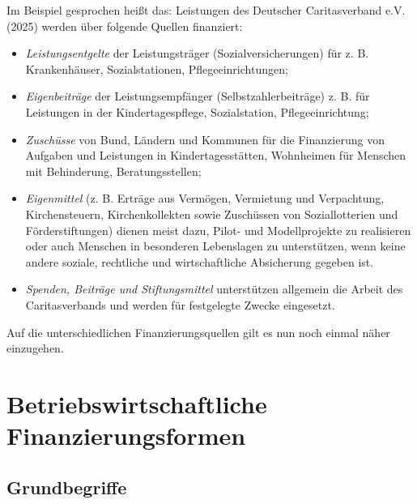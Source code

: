 \documentclass[
  letterpaper,
]{book}
\begin{document}
Im Beispiel gesprochen heißt das: Leistungen des Deutscher
Caritasverband e.V. (2025) werden über folgende Quellen finanziert:

\begin{itemize}
\item
  \emph{Leistungsentgelte} der Leistungsträger (Sozialversicherungen)
  für z. B. Krankenhäuser, Sozialstationen, Pflegeeinrichtungen;
\item
  \emph{Eigenbeiträge} der Leistungsempfänger (Selbstzahlerbeiträge) z.
  B. für Leistungen in der Kindertagespflege, Sozialstation,
  Pflegeeinrichtung;
\item
  \emph{Zuschüsse} von Bund, Ländern und Kommunen für die Finanzierung
  von Aufgaben und Leistungen in Kindertagesstätten, Wohnheimen für
  Menschen mit Behinderung, Beratungsstellen;
\item
  \emph{Eigenmittel} (z. B. Erträge aus Vermögen, Vermietung und
  Verpachtung, Kirchensteuern, Kirchenkollekten sowie Zuschüssen von
  Soziallotterien und Förderstiftungen) dienen meist dazu, Pilot- und
  Modellprojekte zu realisieren oder auch Menschen in besonderen
  Lebenslagen zu unterstützen, wenn keine andere soziale, rechtliche und
  wirtschaftliche Absicherung gegeben ist.
\item
  \emph{Spenden, Beiträge und Stiftungsmittel} unterstützen allgemein
  die Arbeit des Caritasverbands und werden für festgelegte Zwecke
  eingesetzt.
\end{itemize}

Auf die unterschiedlichen Finanzierungsquellen gilt es nun noch einmal
näher einzugehen.

\section{Betriebswirtschaftliche
Finanzierungsformen}\label{betriebswirtschaftliche-finanzierungsformen}

\subsection{Grundbegriffe}\label{grundbegriffe-finanzierungsformen}
\end{document}
